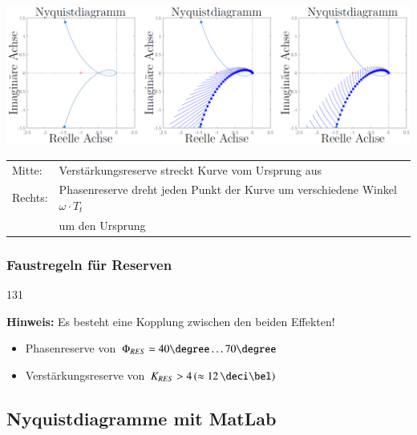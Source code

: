 
\includegraphics[width=\columnwidth]{images/nyquist_stabilitaetsreserven.png}

\begin{tabular}{ll}
    Mitte:  & Verstärkungsreserve streckt Kurve vom Ursprung aus \\
    Rechts: & Phasenreserve dreht jeden Punkt der Kurve um verschiedene Winkel $\omega \cdot T_t$ \\
            & um den Ursprung  
\end{tabular}


\subsubsection{Faustregeln für Reserven}{131}

\textbf{Hinweis:} Es besteht eine Kopplung zwischen den beiden Effekten!

\begin{itemize}
    \item Phasenreserve von $\Phi_{RES} = 40 \degree \ldots 70 \degree$
    \item Verstärkungsreserve von $K_{RES} > 4 \, (\approx 12 \, \deci \bel)$
\end{itemize}


\subsection{Nyquistdiagramme mit MatLab}


